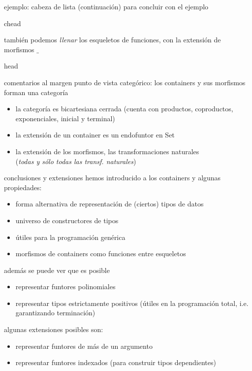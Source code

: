 \documentclass[9pt]{beamer}
\newcommand{\saltar}{\vspace{1ex}}
\begin{document}
\begin{frame}{ejemplo: cabeza de lista (continuación)}
  para concluir con el ejemplo
  \begin{exampleblock}{chead}
  \end{exampleblock}
  \pause
  también podemos \emph{llenar} los esqueletos de funciones, con la extensión de morfismos \AgdaFunction{$\llbracket$} $\_$ \\ \saltar
  \begin{exampleblock}{head}
  \end{exampleblock}
\end{frame}

\begin{frame}{comentarios al margen}
  punto de vista categórico: los containers y sus morfismos forman una categoría
  \begin{itemize}
  \item la categoría es bicartesiana cerrada (cuenta con productos, coproductos, exponenciales, inicial y terminal)
  \item la extensión de un container es un endofuntor en Set
  \item la extensión de los morfismos, las transformaciones naturales\\ ({\small \emph{todas y sólo todas las transf. naturales}})  
  \end{itemize}
\end{frame}

\begin{frame}{conclusiones y extensiones}
  hemos introducido a los containers y algunas propiedades:
  \begin{itemize}
  \item forma alternativa de representación de (ciertos) tipos de datos
  \item universo de constructores de tipos
  \item útiles para la programación genérica
  \item morfismos de containers como funciones entre esqueletos
  \end{itemize}
  además se puede ver que es posible
  \begin{itemize}
  \item representar funtores polinomiales
  \item representar tipos estrictamente positivos (útiles en la programación total, i.e. garantizando terminación)
  \end{itemize}
  algunas extensiones posibles son:
  \begin{itemize}
  \item representar funtores de más de un argumento
  \item representar funtores indexados (para construir tipos dependientes)
  \end{itemize}
\end{frame}
\end{document}
